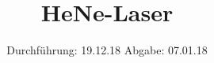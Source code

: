

\subject{V61}
\title{HeNe-Laser}
\date{%
  Durchführung: 19.12.18
  \hspace{3em}
  Abgabe: 07.01.18
}



\maketitle
\thispagestyle{empty}
\tableofcontents
\newpage









\printbibliography



